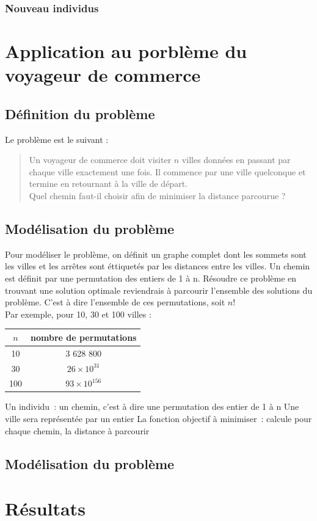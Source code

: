 \documentclass{article}
\begin{document}
		\subsubsection{Nouveau individus}

\section{Application au porblème du voyageur de commerce}
	\subsection{Définition du problème}
	Le problème est le suivant : 
	\begin{quote}
	Un voyageur de commerce doit visiter $n$ villes données en passant par chaque ville exactement une fois. Il commence par une ville quelconque et termine en retournant à la ville de départ.\\
	Quel chemin faut-il choisir afin de minimiser la distance parcourue ?
	\end{quote}
	
	\subsection{Modélisation du problème}
	
	Pour modéliser le problème, on définit un graphe complet dont les sommets sont les villes et les arrêtes sont éttiquetés par les distances entre les villes. Un chemin est définit par une permutation des entiers de 1 à n.
	Résoudre ce problème en trouvant une solution optimale reviendrais à parcourir l'ensemble des solutions du problème. C'est à dire l'ensemble de ces permutations, soit $n!$ \\
	Par exemple, pour 10, 30 et 100 villes : \\
	\begin{tabular}{cc}
	\hline
	$n$ & nombre de permutations \\
	\hline
	10 & 3 628 800 \\
	30 & $26 \times 10^{31}$ \\
	100 & $93 \times 10^{156}$ \\
	\hline
	\end{tabular}

	
	Un individu : un chemin, c'est à dire une permutation des entier de 1 à n
	Une ville sera représentée par un entier
	La fonction objectif à minimiser : calcule pour chaque chemin, la distance à parcourir

	\subsection{Modélisation du problème}

\section{Résultats}
\end{document}
